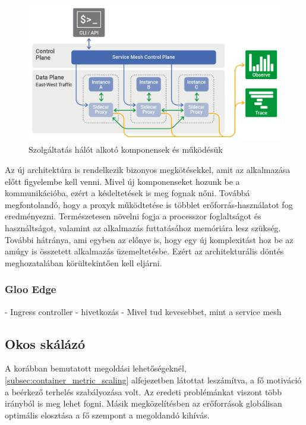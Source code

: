 \begin{figure}[!ht]
\centering
\includegraphics[width=150mm, keepaspectratio]{figures/service-mesh-generic-topology.png}
\caption{Szolgáltatás hálót alkotó komponensek és működésük\citep{serviceMeshTopology}}
\label{fig:serviceMesh-topology}
\end{figure}

Az új architektúra is rendelkezik bizonyos megkötésekkel, amit az alkalmazása előtt figyelembe kell venni.
Mivel új komponenseket hozunk be a kommunikációba, ezért a késleltetések is meg fognak nőni.
Továbbá megfontolandó, hogy a proxyk működtetése is többlet erőforrás-használatot fog eredményezni. 
Természetesen növelni fogja a processzor foglaltságot és használtságot, valamint az alkalmazás futtatásához memóriára lesz szükség.
További hátránya, ami egyben az előnye is, hogy egy új komplexitást hoz be az amúgy is összetett alkalmazás üzemeltetésbe. 
Ezért az architekturális döntés meghozatalában körültekintően kell eljárni.


\subsubsection{Gloo Edge}
- Ingress controller - hivetkozás
- Mivel tud kevesebbet, mint a service mesh

\subsection{Okos skálázó}

A korábban bemutatott megoldási lehetőségeknél, \ref{subsec:container_metric_scaling} alfejezetben látottat leszámítva, a fő motiváció a beérkező terhelés szabályozása volt.
Az eredeti problémánkat viszont több irányból is meg lehet fogni.
Másik megközelítésben az erőforrások globálisan optimális elosztása a fő szempont a megoldandó kihívás.


